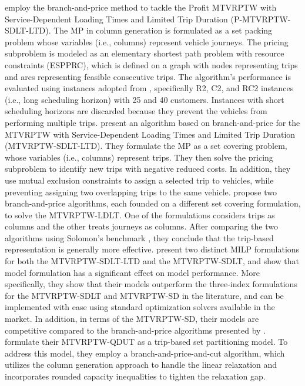 \cite{azi2010exact} employ the branch-and-price method to tackle the Profit MTVRPTW with Service-Dependent Loading Times and Limited Trip Duration (P-MTVRPTW-SDLT-LTD).  The MP in column generation is formulated as a set packing problem whose variables (i.e., columns) represent vehicle journeys.  The pricing subproblem is modeled as an elementary shortest path problem with resource constraints (ESPPRC), which is defined on a graph with nodes representing trips and arcs representing feasible consecutive trips.  The algorithm's performance is evaluated using instances adopted from \cite{solomon1987algorithms}, specifically R2, C2, and RC2 instances (i.e., long scheduling horizon) with 25 and 40 customers.  Instances with short scheduling horizons are discarded because they prevent the vehicles from performing multiple trips.  \cite{hernandez2014new} present an algorithm based on branch-and-price for the MTVRPTW with Service-Dependent Loading Times and Limited Trip Duration (MTVRPTW-SDLT-LTD).  They formulate the MP as a set covering problem, whose variables (i.e., columns) represent trips.  They then solve the pricing subproblem to identify new trips with negative reduced costs.  In addition, they use mutual exclusion constraints to assign a selected trip to vehicles, while preventing assigning two overlapping trips to the same vehicle.
\cite{hernandez2016branch} propose two branch-and-price algorithms, each founded on a different set covering formulation, to solve the MTVRPTW-LDLT.  One of the formulations considers trips as columns and the other treats journeys as columns.  After comparing the two algorithms using Solomon's benchmark \citep{solomon1987algorithms}, they conclude that the trip-based representation is generally more effective.  \cite{neira2020new} present two distinct MILP formulations for both the MTVRPTW-SDLT-LTD and the MTVRPTW-SDLT, and show that model formulation has a significant effect on model performance.  More specifically, they show that their models outperform the three-index formulations for the MTVRPTW-SDLT and MTVRPTW-SD in the literature, and can be implemented with ease using standard optimization solvers available in the market.  In addition, in terms of the MTVRPTW-SD, their models are competitive compared to the branch-and-price algorithms presented by \cite{hernandez2016branch}.  \cite{huang2021multi} formulate their MTVRPTW-QDUT as a trip-based set partitioning model.  To address this model, they employ a branch-and-price-and-cut algorithm, which utilizes the column generation approach to handle the linear relaxation and incorporates rounded capacity inequalities to tighten the relaxation gap.
\newline

